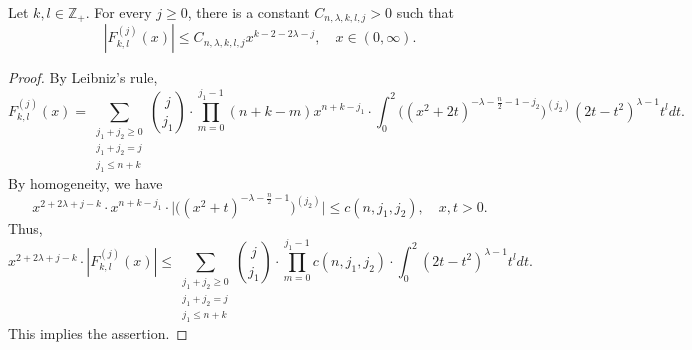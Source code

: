 \documentclass[12pt]{amsart}
\begin{document}
{\color{blue}
\begin{lemma}\label{fourth fkl lemma} Let $k,l\in\mathbb{Z}_+.$ For every $j\geq0$, there is a constant $C_{n,\lambda,k,l,j}>0$ such that
$$|F_{k,l}^{(j)}(x)|\leq C_{n,\lambda,k,l,j}x^{k-2-2\lambda-j},\quad x\in (0,\infty).$$
\end{lemma}
\begin{proof}
By Leibniz's rule,
$$F_{k,l}^{(j)}(x)=\sum_{\substack{j_1+j_2\geq0\\ j_1+j_2=j\\ j_1\leq n+k}}\binom{j}{j_1}\cdot \prod_{m=0}^{j_1-1}(n+k-m)x^{n+k-j_1}\cdot \int_0^2\big((x^2+2t)^{-\lambda-\frac{n}{2}-1-j_2}\big)^{(j_2)}(2t-t^2)^{\lambda-1}t^ldt.$$
By homogeneity, we have
$$x^{2+2\lambda+j-k}\cdot x^{n+k-j_1}\cdot\Big|\big((x^2+t)^{-\lambda-\frac{n}{2}-1}\big)^{(j_2)}\Big|\leq c(n,j_1,j_2),\quad x,t>0.$$
Thus,
$$x^{2+2\lambda+j-k}\cdot|F_{k,l}^{(j)}(x)|\leq\sum_{\substack{j_1+j_2\geq0\\ j_1+j_2=j\\ j_1\leq n+k}}\binom{j}{j_1}\cdot \prod_{m=0}^{j_1-1} c(n,j_1,j_2)\cdot \int_0^2(2t-t^2)^{\lambda-1}t^ldt.$$
This implies the assertion.
\end{proof}}
\end{document}
